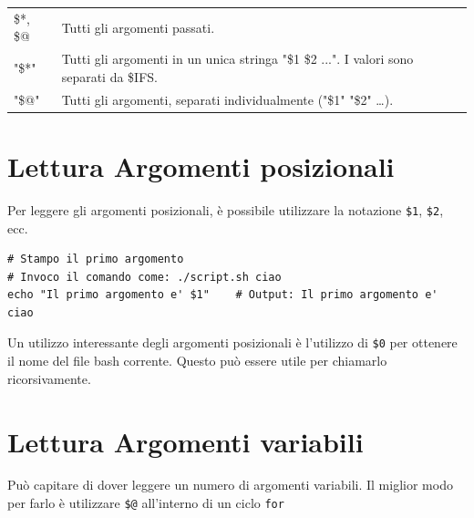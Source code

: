 \documentclass[a4paper]{report}
\newenvironment{code}{\begin{tcolorbox}[size=small]}{\end{tcolorbox}}
\begin{document}
\begin{table}[h]
\begin{tabular}{ll}
		\$*, \$@ & Tutti gli argomenti passati.                                                                                                                                                                                                                                                                                                                                                                                              \\
		"\$*"  & Tutti gli argomenti in un unica stringa "\$1 \$2 ...". I valori sono separati da \$IFS.      \\
		"\$@"  & Tutti gli argomenti, separati individualmente ("\$1" "\$2" …).                                                                                                                                                                                                                                                                                                                                                                         
	\end{tabular}
\end{table}

\section{Lettura Argomenti posizionali}

Per leggere gli argomenti posizionali, è possibile utilizzare la notazione \texttt{\$1}, \texttt{\$2}, ecc.

\begin{code}
\begin{lstlisting}
# Stampo il primo argomento
# Invoco il comando come: ./script.sh ciao
echo "Il primo argomento e' $1"    # Output: Il primo argomento e' ciao
\end{lstlisting}
\end{code}

Un utilizzo interessante degli argomenti posizionali è l'utilizzo di \texttt{\$0} per ottenere il nome del file bash corrente. Questo può essere utile per chiamarlo ricorsivamente.

\section{Lettura Argomenti variabili}

Può capitare di dover leggere un numero di argomenti variabili. Il miglior modo per farlo è utilizzare \texttt{\$@} all'interno di un ciclo \texttt{for}
\end{document}
